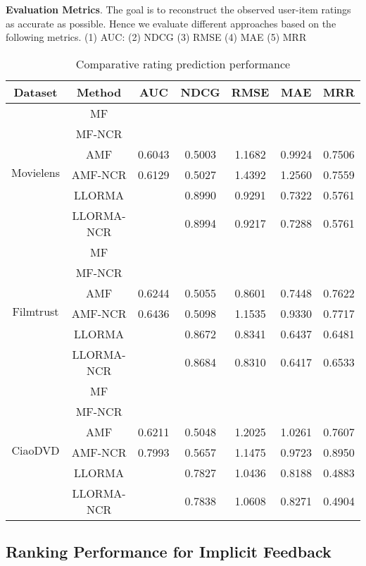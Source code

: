 \documentclass[letterpaper]{article} %
\begin{document}
\textbf{Evaluation Metrics}.  The goal is to reconstruct the observed user-item ratings as accurate as possible. Hence we evaluate different approaches based on the following metrics. (1) AUC: (2) NDCG (3) RMSE (4) MAE (5) MRR

\begin{table}[htp]
\tiny
\caption{Comparative rating prediction performance}
\begin{center}
\begin{tabular}{|c|c|c|c|c|c|c|}
\hline
Dataset & Method & AUC & NDCG & RMSE & MAE & MRR \\\hline
\multirow{6}{*}{Movielens} & MF & & & & & \\\cline{2-7}
 & MF-NCR & & & & & \\\cline{2-7}
 & AMF &0.6043 &0.5003 &1.1682 &0.9924 &0.7506 \\\cline{2-7}
 & AMF-NCR &0.6129 &0.5027 &1.4392 &1.2560 &0.7559 \\\cline{2-7}
 & LLORMA & &0.8990 &0.9291 &0.7322 &0.5761 \\\cline{2-7}
 & LLORMA-NCR & &0.8994 &0.9217 &0.7288 &0.5761 \\\hline
\multirow{6}{*}{Filmtrust} & MF & & & & & \\\cline{2-7}
 & MF-NCR & & & & & \\\cline{2-7}
 & AMF &0.6244 &0.5055 &0.8601 &0.7448 &0.7622 \\\cline{2-7}
 & AMF-NCR &0.6436 &0.5098 &1.1535 &0.9330 &0.7717 \\\cline{2-7}
 & LLORMA & &0.8672 &0.8341 &0.6437 &0.6481 \\\cline{2-7}
 & LLORMA-NCR & &0.8684 &0.8310 &0.6417 &0.6533 \\\hline
 \multirow{6}{*}{CiaoDVD} & MF & & & & & \\\cline{2-7}
 & MF-NCR & & & & & \\\cline{2-7}
 & AMF &0.6211 &0.5048 &1.2025 &1.0261 &0.7607\\\cline{2-7}
 & AMF-NCR &0.7993 &0.5657 &1.1475 &0.9723 &0.8950 \\\cline{2-7}
 & LLORMA & &0.7827 &1.0436 &0.8188 &0.4883 \\\cline{2-7}
 & LLORMA-NCR & &0.7838 &1.0608 &0.8271 &0.4904 \\\hline
\end{tabular}
\end{center}
\label{tab:ratingresult}
\end{table}%

\subsection{Ranking Performance for Implicit Feedback}
\end{document}
